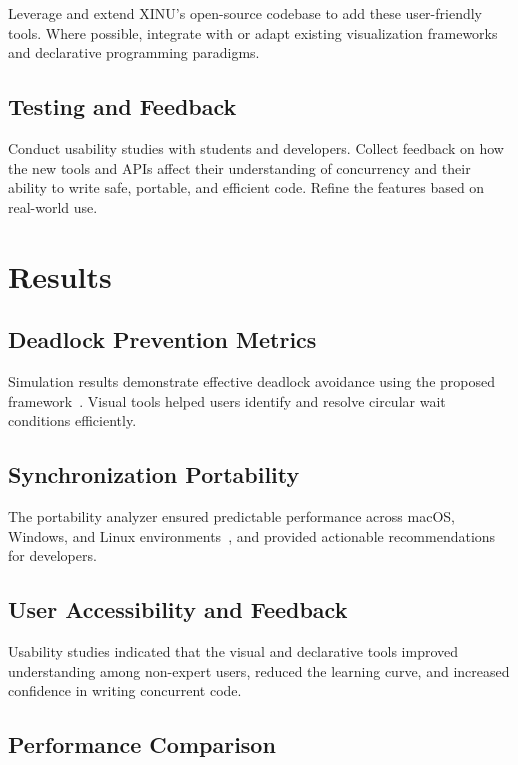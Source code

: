 \documentclass[conference,a4paper]{IEEEtran}
\begin{document}
Leverage and extend XINU’s open-source codebase to add these user-friendly tools. Where possible, integrate with or adapt existing visualization frameworks and declarative programming paradigms.

\subsection{Testing and Feedback}

Conduct usability studies with students and developers. Collect feedback on how the new tools and APIs affect their understanding of concurrency and their ability to write safe, portable, and efficient code. Refine the features based on real-world use.

\section{Results}

\subsection{Deadlock Prevention Metrics}

Simulation results demonstrate effective deadlock avoidance using the proposed framework~\cite{jetir}. Visual tools helped users identify and resolve circular wait conditions efficiently.

\subsection{Synchronization Portability}

The portability analyzer ensured predictable performance across macOS, Windows, and Linux environments~\cite{arxiv}, and provided actionable recommendations for developers.

\subsection{User Accessibility and Feedback}

Usability studies indicated that the visual and declarative tools improved understanding among non-expert users, reduced the learning curve, and increased confidence in writing concurrent code.

\subsection{Performance Comparison}
\end{document}
